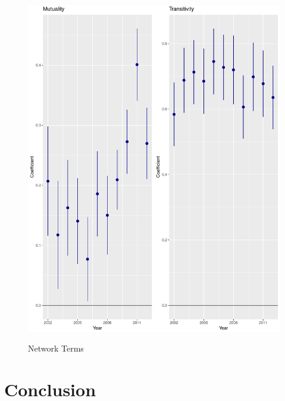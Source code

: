 \documentclass{article}
\begin{document}
\begin{figure}[h]
\centering
\includegraphics[scale=.75]{draft_figures/n_terms.pdf}\\
  \caption{Network Terms}
  \label{fig:1}
\end{figure}







\section{Conclusion}


\newpage


\end{document}
